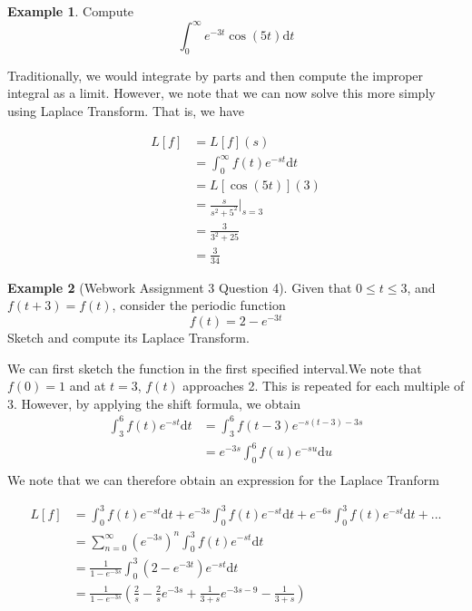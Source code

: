 \documentclass[11pt]{article}
\theoremstyle{plain} %
\theoremstyle{definition}
\theoremstyle{example}
\newtheorem*{example}{Example}
\theoremstyle{remark}
\begin{document}
\begin{example}
Compute $$\int_0^{\infty}e^{-3t}\cos(5t)\mathrm d t$$
\end{example}

Traditionally, we would integrate by parts and then compute the improper integral as a limit. However, we note that we can now solve this more simply using Laplace Transform. That is, we have 

\begin{align*}
L[f] &= L[f](s) \\
&= \int_0^{\infty}f(t)e^{-st} \mathrm d t\\
&= L[\cos(5t)](3) \\
&= \frac{s}{s^2 + 5^2}|_{s=3} \\
&= \frac{3}{3^2 + 25} \\
&= \frac{3}{34}
\end{align*}

\begin{example}[Webwork Assignment 3 Question 4]
Given that $0 \leq t \leq 3$, and $f(t+3) = f(t)$, consider the periodic function
$$f(t) = 2-e^{-3t}$$ Sketch and compute its Laplace Transform. 
\end{example}

We can first sketch the function in the first specified interval.We note that $f(0) = 1$ and at $t=3$, $f(t)$ approaches 2. This is repeated for each multiple of 3. 
However, by applying the shift formula, we obtain
\begin{align*}
\int_3^6 f(t) e^{-st}\mathrm d t &= \int_3^6f(t-3)e^{-s(t-3)-3s} \\
&= e^{-3s}\int_0^6f(u)e^{-su} \mathrm d u \\
\end{align*}
We note that we can therefore obtain an expression for the Laplace Tranform

\begin{align*}
L[f] &= \int_0^3f(t)e^{-st} \mathrm d t +e^{-3s} \int_0^3f(t)e^{-st} \mathrm d t + e^{-6s}\int_0^3f(t)e^{-st}\mathrm d t + ...\\
&= \sum_{n=0}^{\infty}\left(e^{-3s}\right)^n\int_0^3f(t)e^{-st}\mathrm d t \\
&= \frac{1}{1-e^{-3s}}\int_0^3\left(2-e^{-3t}\right)e^{-st} \mathrm d t \\
&= \frac{1}{1-e^{-3s}}\left(\frac{2}{s} - \frac{2}{s}e^{-3s} + \frac{1}{3+s}e^{-3s-9} - \frac{1}{3+s}\right)
\end{align*}
\end{document}
